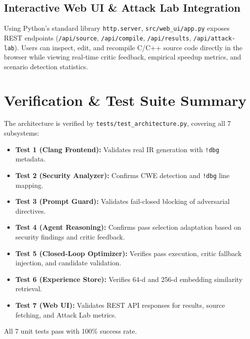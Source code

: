 \documentclass[11pt]{article}
\begin{document}
\subsection{Interactive Web UI \& Attack Lab Integration}
Using Python's standard library \texttt{http.server}, \texttt{src/web\_ui/app.py} exposes REST endpoints (\texttt{/api/source}, \texttt{/api/compile}, \texttt{/api/results}, \texttt{/api/attack-lab}). Users can inspect, edit, and recompile C/C++ source code directly in the browser while viewing real-time critic feedback, empirical speedup metrics, and scenario detection statistics.

\section{Verification \& Test Suite Summary}
The architecture is verified by \texttt{tests/test\_architecture.py}, covering all 7 subsystems:
\begin{itemize}
    \item \textbf{Test 1 (Clang Frontend):} Validates real IR generation with \texttt{!dbg} metadata.
    \item \textbf{Test 2 (Security Analyzer):} Confirms CWE detection and \texttt{!dbg} line mapping.
    \item \textbf{Test 3 (Prompt Guard):} Validates fail-closed blocking of adversarial directives.
    \item \textbf{Test 4 (Agent Reasoning):} Confirms pass selection adaptation based on security findings and critic feedback.
    \item \textbf{Test 5 (Closed-Loop Optimizer):} Verifies pass execution, critic fallback injection, and candidate validation.
    \item \textbf{Test 6 (Experience Store):} Verifies 64-d and 256-d embedding similarity retrieval.
    \item \textbf{Test 7 (Web UI):} Validates REST API responses for results, source fetching, and Attack Lab metrics.
\end{itemize}
All 7 unit tests pass with 100\% success rate.
\end{document}
